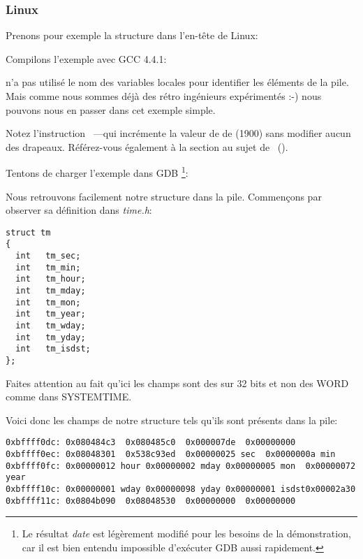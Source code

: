 ﻿\subsubsection{Linux}

Prenons pour exemple la structure  dans l'en-tête  de Linux:



Compilons l'exemple avec GCC 4.4.1:



\IDA n'a pas utilisé le nom des variables locales pour identifier les éléments de la pile.
Mais comme nous sommes déjà des rétro ingénieurs expérimentés :-) nous pouvons nous en passer dans
cet exemple simple.


Notez l'instruction ~---qui incrémente la valeur de \EAX de  (1900)
sans modifier aucun des drapeaux. Référez-vous également à la section au sujet de \LEA{}~().


Tentons de charger l'exemple dans GDB \footnote{Le résultat \emph{date} est légèrement modifié pour
les besoins de la démonstration, car il est bien entendu impossible d'exécuter GDB aussi rapidement.}:



Nous retrouvons facilement notre structure dans la pile. Commençons par observer sa définition dans
\emph{time.h}:

\begin{lstlisting}[caption=time.h, label=struct_tm,style=customc]
struct tm
{
  int	tm_sec;
  int	tm_min;
  int	tm_hour;
  int	tm_mday;
  int	tm_mon;
  int	tm_year;
  int	tm_wday;
  int	tm_yday;
  int	tm_isdst;
};
\end{lstlisting}

Faites attention au fait qu'ici les champs sont des \Tint sur 32 bits et non des WORD comme dans
SYSTEMTIME.

Voici donc les champs de notre structure tels qu'ils sont présents dans la pile:

\begin{lstlisting}
0xbffff0dc:	0x080484c3	0x080485c0	0x000007de	0x00000000
0xbffff0ec:	0x08048301	0x538c93ed	0x00000025 sec	0x0000000a min
0xbffff0fc:	0x00000012 hour	0x00000002 mday	0x00000005 mon 	0x00000072 year
0xbffff10c:	0x00000001 wday	0x00000098 yday	0x00000001 isdst0x00002a30
0xbffff11c:	0x0804b090	0x08048530	0x00000000	0x00000000
\end{lstlisting}


